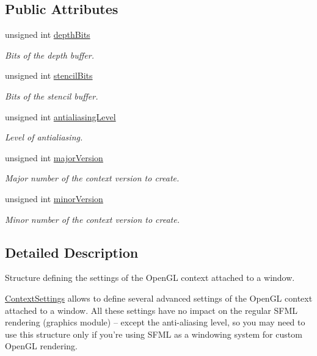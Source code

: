 \subsection*{Public Attributes}
\begin{DoxyCompactItemize}
\item 
unsigned int \hyperlink{structsf_1_1_context_settings_a4809e22089c2af7276b8809b5aede7bb}{depth\-Bits}
\begin{DoxyCompactList}\small\item\em Bits of the depth buffer. \end{DoxyCompactList}\item 
unsigned int \hyperlink{structsf_1_1_context_settings_ac2e788c201ca20e84fd38a28071abd29}{stencil\-Bits}
\begin{DoxyCompactList}\small\item\em Bits of the stencil buffer. \end{DoxyCompactList}\item 
unsigned int \hyperlink{structsf_1_1_context_settings_ac4a097be18994dba38d73f36b0418bdc}{antialiasing\-Level}
\begin{DoxyCompactList}\small\item\em Level of antialiasing. \end{DoxyCompactList}\item 
unsigned int \hyperlink{structsf_1_1_context_settings_a99a680d5c15a7e34c935654155dd5166}{major\-Version}
\begin{DoxyCompactList}\small\item\em Major number of the context version to create. \end{DoxyCompactList}\item 
unsigned int \hyperlink{structsf_1_1_context_settings_aaeb0efe9d2658b840da93b30554b100f}{minor\-Version}
\begin{DoxyCompactList}\small\item\em Minor number of the context version to create. \end{DoxyCompactList}\end{DoxyCompactItemize}


\subsection{Detailed Description}
Structure defining the settings of the Open\-G\-L context attached to a window. 

\hyperlink{structsf_1_1_context_settings}{Context\-Settings} allows to define several advanced settings of the Open\-G\-L context attached to a window. All these settings have no impact on the regular S\-F\-M\-L rendering (graphics module) -- except the anti-\/aliasing level, so you may need to use this structure only if you're using S\-F\-M\-L as a windowing system for custom Open\-G\-L rendering.

